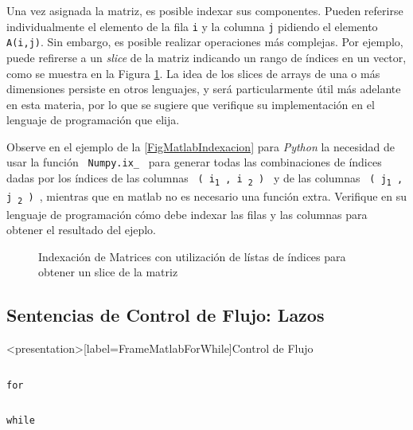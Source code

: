 Una vez asignada la matriz, es posible indexar sus componentes. 
Pueden referirse individualmente el elemento de la fila \texttt{i} y la
columna \texttt{j} pidiendo el elemento \texttt{A(i,j)}. Sin 
embargo, es posible realizar operaciones más complejas. Por ejemplo,
puede refirerse a un \emph{slice} de la matriz indicando un rango 
de índices en un vector, como se muestra en la Figura 
\ref{FigMatlabIndexacion}. La idea de los slices de arrays de una o 
más dimensiones persiste en otros lenguajes, y será particularmente
útil más adelante en esta materia, por lo que se sugiere que
verifique su implementación en el lenguaje de programación 
que elija. 

Observe en el ejemplo de la \autoref{FigMatlabIndexacion} para \emph{Python}
la necesidad de usar la función \texttt{ Numpy.ix\_ } para generar todas las 
combinaciones de índices dadas por los índices de las columnas 
\texttt{ ( i\textsubscript{1} , i \textsubscript{2} ) }
y de las columnas \texttt{ ( j\textsubscript{1} , j \textsubscript{2} ) }, 
mientras que en matlab no es necesario
una función extra. Verifique en su lenguaje de programación cómo debe indexar 
las filas y las columnas para obtener el resultado del ejeplo. 

\mode*

\begin{figure}
  \caption{ Indexación de Matrices con utilización de lístas de índices para
 obtener un slice de la matriz \label{FigMatlabIndexacion} }
\end{figure}

\mode*

\subsection{Sentencias de Control de Flujo: Lazos}

\begin{frame}<presentation>[label=FrameMatlabForWhile]{Control de Flujo}
\begin{columns}[T]
\hfill \large\texttt{for}

\begin{codeblock}

\end{codeblock}
\end{columns}

\begin{columns}[T]
\hfill \large\texttt{while}

\begin{codeblock}

\end{codeblock}

\end{columns}
\end{frame}

